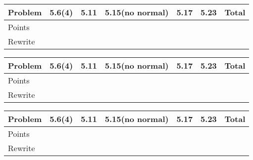 \documentclass{fkpset}
\begin{document}
\begin{table}[H]
  \centering
  \begin{tabular}{lcccccr} \toprule
    Problem & 5.6(4) & 5.11 & 5.15(no normal) & 5.17 & 5.23 & Total \\
    \midrule
    Points & \\\midrule
    Rewrite & \\\bottomrule
  \end{tabular}
\end{table}
\begin{table}[H]
  \centering
  \begin{tabular}{lcccccr} \toprule
    Problem & 5.6(4) & 5.11 & 5.15(no normal) & 5.17 & 5.23 & Total \\
    \midrule
    Points & \\\midrule
    Rewrite & \\\bottomrule
  \end{tabular}
\end{table}
\begin{table}[H]
  \centering
  \begin{tabular}{lcccccr} \toprule
    Problem & 5.6(4) & 5.11 & 5.15(no normal) & 5.17 & 5.23 & Total \\
    \midrule
    Points & \\\midrule
    Rewrite & \\\bottomrule
  \end{tabular}
\end{table}
\end{document}

